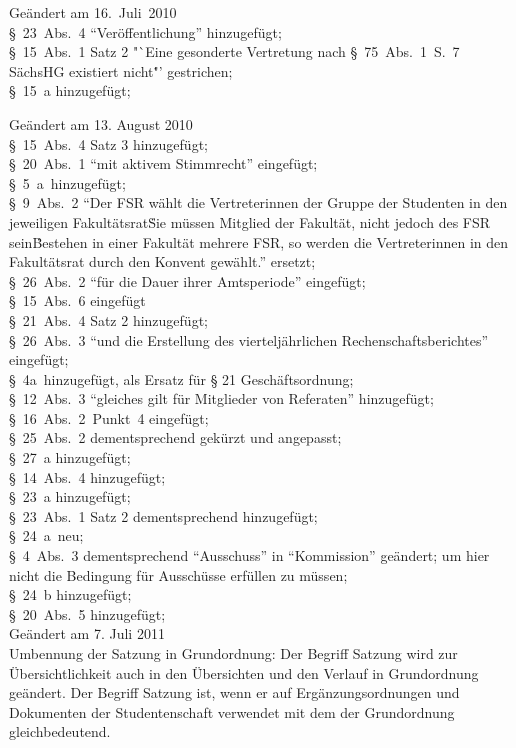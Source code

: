 Geändert am 16.~Juli~2010\\
§~23~Abs.~4 "`Veröffentlichung"' hinzugefügt;\\
§~15~Abs.~1 Satz 2 "`Eine gesonderte Vertretung nach §~75~Abs.~1~S.~7 SächsHG existiert nicht\."' gestrichen;\\
§~15~a hinzugefügt;

Geändert am 13. August 2010\\
§~15~Abs.~4 Satz 3 hinzugefügt;\\
§~20~Abs.~1 "`mit aktivem Stimmrecht"' eingefügt;\\
§~5~a~hinzugefügt;\\
§~9~Abs.~2 "`Der FSR wählt die Vertreterinnen der Gruppe der Studenten in den jeweiligen Fakultätsrat\. Sie müssen Mitglied der Fakultät, nicht jedoch des FSR sein\. Bestehen in einer Fakultät mehrere FSR, so werden die Vertreterinnen in den Fakultätsrat durch den Konvent gewählt."' ersetzt;\\
§~26~Abs.~2 "`für die Dauer ihrer Amtsperiode"' eingefügt;\\
§~15~Abs.~6 eingefügt\\
§~21~Abs.~4 Satz 2 hinzugefügt;\\
§~26~Abs.~3 "`und die Erstellung des vierteljährlichen Rechenschaftsberichtes"' eingefügt;\\
§~4a~hinzugefügt, als Ersatz für § 21 Geschäftsordnung;\\
§~12~Abs.~3 "`gleiches gilt für Mitglieder von Referaten"' hinzugefügt;\\
§~16~Abs.~2~Punkt~4 eingefügt;\\
§~25~Abs.~2 dementsprechend gekürzt und angepasst;\\
§~27~a hinzugefügt;\\
§~14~Abs.~4 hinzugefügt;\\
§~23~a hinzugefügt;\\
§~23~Abs.~1 Satz 2 dementsprechend hinzugefügt;\\
§~24~a~neu;\\
§~4~Abs.~3 dementsprechend "`Ausschuss"' in "`Kommission"' geändert; um hier nicht die Bedingung für Ausschüsse erfüllen zu müssen;\\
§~24~b hinzugefügt;\\
§~20~Abs.~5 hinzugefügt;\\

Geändert am 7. Juli 2011\\
Umbennung der Satzung in Grundordnung: Der Begriff Satzung wird zur Übersichtlichkeit auch in den Übersichten und den Verlauf in Grundordnung geändert. Der Begriff Satzung ist, wenn er auf Ergänzungsordnungen und Dokumenten der Studentenschaft verwendet mit dem der Grundordnung gleichbedeutend.\\

